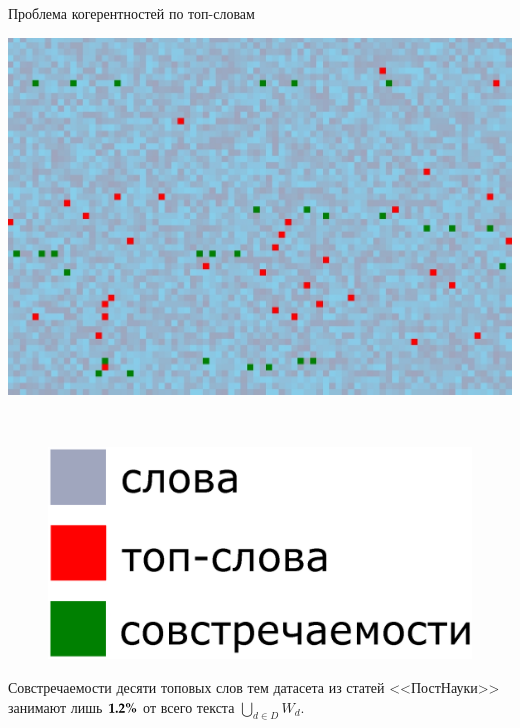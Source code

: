 \documentclass[sans, mathsans, russian]{beamer}
\begin{document}
\begin{frame}{Проблема когерентностей по топ-словам}
  \begin{minipage}{0.68\textwidth}
    \includegraphics[width=\textwidth]{doc11358_topic0.jpg}
  \end{minipage}
  ~
  \begin{minipage}{0.28\textwidth}
    \begin{figure}[t]
      \includegraphics[width=\textwidth]{legend.eps}
    \end{figure}
  \end{minipage}

  \begin{block}{}
    Совстречаемости десяти топовых слов тем датасета из статей <<ПостНауки>>
    занимают лишь ${\boldsymbol{1.2\%}}$ от всего текста
    $\bigcup\nolimits_{d \in D} W_d$.
  \end{block}
\end{frame}
\end{document}
